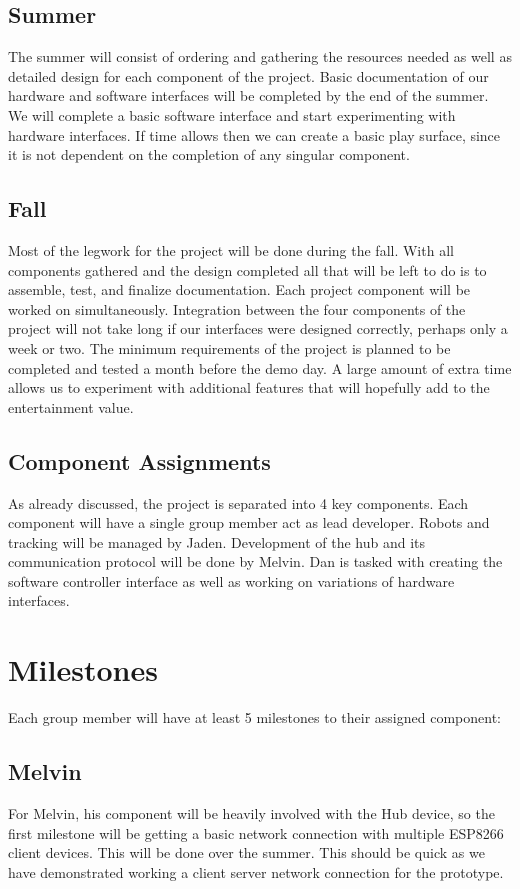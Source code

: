 \documentclass[11pt]{ieeeconf}
\begin{document}
\subsection{Summer}
The summer will consist of ordering and gathering the resources needed as well as detailed design for each component of the project. Basic documentation of our hardware and software interfaces will be completed by the end of the summer. We will complete a basic software interface and start experimenting with hardware interfaces. If time allows then we can create a basic play surface, since it is not dependent on the completion of any singular component.

\subsection{Fall}
Most of the legwork for the project will be done during the fall. With all components gathered and the design completed all that will be left to do is to assemble, test, and finalize documentation. Each project component will be worked on simultaneously. Integration between the four components of the project will not take long if our interfaces were designed correctly, perhaps only a week or two. The minimum requirements of the project is planned to be completed and tested a month before the demo day. A large amount of extra time allows us to experiment with additional features that will hopefully add to the entertainment value.

\subsection{Component Assignments}
As already discussed, the project is separated into 4 key components. Each component will have a single group member act as lead developer. Robots and tracking will be managed by Jaden. Development of the hub and its communication protocol will be done by Melvin. Dan is tasked with creating the software controller interface as well as working on variations of hardware interfaces. 


\section{Milestones}
Each group member will have at least 5 milestones to their assigned component: 

\subsection{Melvin}
For Melvin, his component will be heavily involved with the Hub device, so the first milestone will be getting a basic network connection with multiple ESP8266 client devices. This will be done over the summer. This should be quick as we have demonstrated working a client server network connection for the prototype. 
\end{document}
